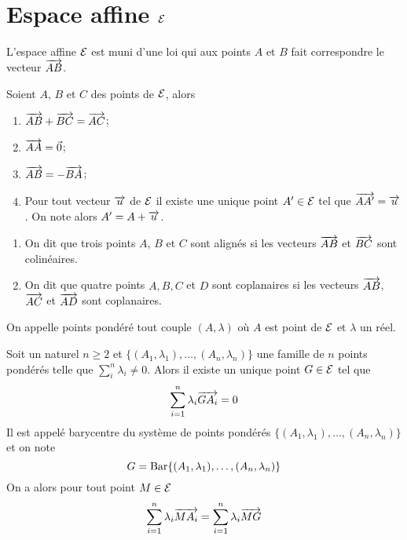 \section{Espace affine \(\mathcal{E}\)}

L'espace affine \(\mathcal{E}\) est muni d'une loi qui aux points \(A\) et \(B\) fait 
correspondre le vecteur \(\overrightarrow{AB}\).

\begin{prop}
  Soient \(A\), \(B\) et \(C\) des points de \(\mathcal{E}\), alors
  \begin{enumerate}
    \item \(\overrightarrow{AB}+\overrightarrow{BC} = \overrightarrow{AC}\);
    \item \(\overrightarrow{AA}=\vec{0}\);
    \item \(\overrightarrow{AB} = -\overrightarrow{BA}\);
    \item Pour tout vecteur \(\overrightarrow{u}\) de \(\mathcal{E}\) il existe une unique point \(A' 
      \in \mathcal{E}\) tel que \(\overrightarrow{AA'}=\overrightarrow{u}\). On note alors \(A'=A+\overrightarrow{u}\).
  \end{enumerate}
\end{prop}
\begin{defdef}
  \begin{enumerate}
    \item On dit que trois points \(A\), \(B\) et \(C\) sont alignés si les 
      vecteurs \(\overrightarrow{AB}\) et \(\overrightarrow{BC}\) sont colinéaires.
    \item On dit que quatre points \(A, B, C\) et \(D\) sont coplanaires si les 
      vecteurs \(\overrightarrow{AB}\), \(\overrightarrow{AC}\) et \(\overrightarrow{AD}\) sont coplanaires.
  \end{enumerate}
\end{defdef}
\begin{defdef}
  On appelle points pondéré tout couple \((A,\lambda)\) où \(A\) est point de 
  \(\mathcal{E}\) et \(\lambda\) un réel.
\end{defdef}
\begin{prop}
  Soit un naturel \(n \geq 2\) et \(\{(A_1,\lambda_1), \ldots, 
  (A_n,\lambda_n)\}\) une famille de \(n\) points pondérés telle que 
  \(\sum_i^n\lambda_i \neq 0\). Alors il existe un unique point \(G \in \mathcal{E}\) 
  tel que
  \begin{equation}
    \sum_{i=1}^n \lambda_i \overrightarrow{GA_i}=0
  \end{equation}
  Il est appelé barycentre du système de points pondérés \(\{(A_1,\lambda_1), 
  \ldots, (A_n,\lambda_n)\}\) et on note
  \begin{equation}
    G = \operatorname{Bar}\{(A_1,\lambda_1), \ldots, (A_n,\lambda_n)\}
  \end{equation}
  On a alors pour tout point \(M \in \mathcal{E}\)
  \begin{equation}
    \sum_{i=1}^n \lambda_i \overrightarrow{MA_i} = \sum_{i=1}^n \lambda_i \overrightarrow{MG}
  \end{equation}
\end{prop}
